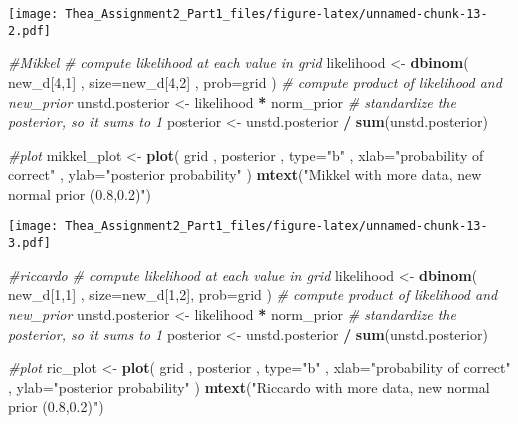 \documentclass[]{article}
\newenvironment{Shaded}{\begin{snugshade}}{\end{snugshade}}
\newcommand{\KeywordTok}[1]{\textcolor[rgb]{0.13,0.29,0.53}{\textbf{#1}}}
\newcommand{\DataTypeTok}[1]{\textcolor[rgb]{0.13,0.29,0.53}{#1}}
\newcommand{\DecValTok}[1]{\textcolor[rgb]{0.00,0.00,0.81}{#1}}
\newcommand{\StringTok}[1]{\textcolor[rgb]{0.31,0.60,0.02}{#1}}
\newcommand{\CommentTok}[1]{\textcolor[rgb]{0.56,0.35,0.01}{\textit{#1}}}
\newcommand{\OperatorTok}[1]{\textcolor[rgb]{0.81,0.36,0.00}{\textbf{#1}}}
\newcommand{\NormalTok}[1]{#1}
\begin{document}
\texttt{[image: Thea\_Assignment2\_Part1\_files/figure-latex/unnamed-chunk-13-2.pdf]}

\begin{Shaded}
\begin{Highlighting}[]
\CommentTok{#Mikkel}
\CommentTok{# compute likelihood at each value in grid}
\NormalTok{likelihood <-}\StringTok{ }\KeywordTok{dbinom}\NormalTok{( new_d[}\DecValTok{4}\NormalTok{,}\DecValTok{1}\NormalTok{] , }\DataTypeTok{size=}\NormalTok{new_d[}\DecValTok{4}\NormalTok{,}\DecValTok{2}\NormalTok{] , }\DataTypeTok{prob=}\NormalTok{grid )}
\CommentTok{# compute product of likelihood and new_prior}
\NormalTok{unstd.posterior <-}\StringTok{ }\NormalTok{likelihood }\OperatorTok{*}\StringTok{ }\NormalTok{norm_prior}
\CommentTok{# standardize the posterior, so it sums to 1}
\NormalTok{posterior <-}\StringTok{ }\NormalTok{unstd.posterior }\OperatorTok{/}\StringTok{ }\KeywordTok{sum}\NormalTok{(unstd.posterior)}

\CommentTok{#plot}
\NormalTok{mikkel_plot <-}\StringTok{ }\KeywordTok{plot}\NormalTok{( grid , posterior , }\DataTypeTok{type=}\StringTok{"b"}\NormalTok{ ,}
    \DataTypeTok{xlab=}\StringTok{"probability of correct"}\NormalTok{ , }\DataTypeTok{ylab=}\StringTok{"posterior probability"}\NormalTok{ )}
\KeywordTok{mtext}\NormalTok{(}\StringTok{"Mikkel with more data, new normal prior (0.8,0.2)"}\NormalTok{)}
\end{Highlighting}
\end{Shaded}

\texttt{[image: Thea\_Assignment2\_Part1\_files/figure-latex/unnamed-chunk-13-3.pdf]}

\begin{Shaded}
\begin{Highlighting}[]
\CommentTok{#riccardo}
\CommentTok{# compute likelihood at each value in grid}
\NormalTok{likelihood <-}\StringTok{ }\KeywordTok{dbinom}\NormalTok{( new_d[}\DecValTok{1}\NormalTok{,}\DecValTok{1}\NormalTok{] , }\DataTypeTok{size=}\NormalTok{new_d[}\DecValTok{1}\NormalTok{,}\DecValTok{2}\NormalTok{], }\DataTypeTok{prob=}\NormalTok{grid )}
\CommentTok{# compute product of likelihood and new_prior}
\NormalTok{unstd.posterior <-}\StringTok{ }\NormalTok{likelihood }\OperatorTok{*}\StringTok{ }\NormalTok{norm_prior}
\CommentTok{# standardize the posterior, so it sums to 1}
\NormalTok{posterior <-}\StringTok{ }\NormalTok{unstd.posterior }\OperatorTok{/}\StringTok{ }\KeywordTok{sum}\NormalTok{(unstd.posterior)}

\CommentTok{#plot}
\NormalTok{ric_plot <-}\StringTok{ }\KeywordTok{plot}\NormalTok{( grid , posterior , }\DataTypeTok{type=}\StringTok{"b"}\NormalTok{ ,}
    \DataTypeTok{xlab=}\StringTok{"probability of correct"}\NormalTok{ , }\DataTypeTok{ylab=}\StringTok{"posterior probability"}\NormalTok{ )}
\KeywordTok{mtext}\NormalTok{(}\StringTok{"Riccardo with more data, new normal prior (0.8,0.2)"}\NormalTok{)}
\end{Highlighting}
\end{Shaded}
\end{document}
